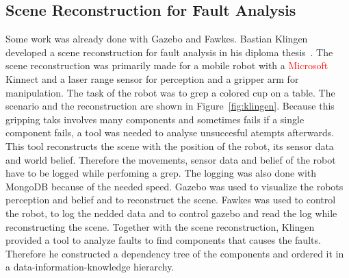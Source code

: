 \subsection{Scene Reconstruction for Fault Analysis}
Some work was already done with Gazebo and Fawkes. Bastian Klingen developed a scene reconstruction for fault analysis in his diploma thesis~\cite{KlingenDA}. The scene reconstruction was primarily made for a mobile robot with a \textcolor{red}{Microsoft} Kinnect and a laser range sensor for perception and a gripper arm for manipulation. The task of the robot was to grep a colored cup on a table. The scenario and the reconstruction are shown in Figure~\ref{fig:klingen}. Because this gripping taks involves many components and sometimes fails if a single component fails, a tool was needed to analyse unsuccesful atempts afterwards. This tool reconstructs the scene with the position of the robot, its sensor data and world belief. Therefore the movements, sensor data and belief of the robot have to be logged while perfoming a grep. The logging was also done with MongoDB because of the needed speed. Gazebo was used to visualize the robots perception and belief and to reconstruct the scene. Fawkes was used to control the robot, to log the nedded data and to control gazebo and read the log while reconstructing the scene. Together with the scene reconstruction, Klingen provided a tool to analyze faults to find components that causes the faults. Therefore he constructed a dependency tree of the components and ordered it in a data-information-knowledge hierarchy.\\
